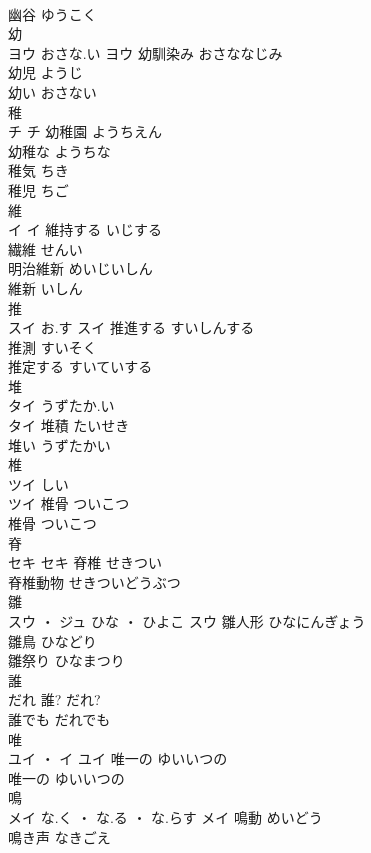 \documentclass[8pt]{extreport}
\begin{document}
\begin{CJK}{UTF8}{min}
\\	幽谷	ゆうこく	
\\	幼	
\\	ヨウ	おさな.い	ヨウ	幼馴染み	おさななじみ	
\\	幼児	ようじ	
\\	幼い	おさない	
\\	稚	
\\	チ		チ	幼稚園	ようちえん	
\\	幼稚な	ようちな	
\\	稚気	ちき	
\\	稚児	ちご	
\\	維	
\\	イ		イ	維持する	いじする	
\\	繊維	せんい	
\\	明治維新	めいじいしん	
\\	維新	いしん	
\\	推	
\\	スイ	お.す	スイ	推進する	すいしんする	
\\	推測	すいそく	
\\	推定する	すいていする	
\\	堆	
\\	タイ	うずたか.い
\\	タイ	堆積	たいせき	
\\	堆い	うずたかい	
\\	椎	
\\	ツイ	しい
\\	ツイ	椎骨	ついこつ	
\\	椎骨	ついこつ	
\\	脊	
\\	セキ		セキ	脊椎	せきつい	
\\	脊椎動物	せきついどうぶつ	
\\	雛	
\\	スウ ・ ジュ	ひな ・ ひよこ	スウ	雛人形	ひなにんぎょう	
\\	雛鳥	ひなどり	
\\	雛祭り	ひなまつり	
\\	誰	
\\	だれ														誰?	だれ?	
\\	誰でも	だれでも	
\\	唯	
\\	ユイ ・ イ		ユイ	唯一の	ゆいいつの	
\\	唯一の	ゆいいつの	
\\	鳴	
\\	メイ	な.く ・ な.る ・ な.らす	メイ	鳴動	めいどう	
\\	鳴き声	なきごえ	

\end{CJK}
\end{document}
